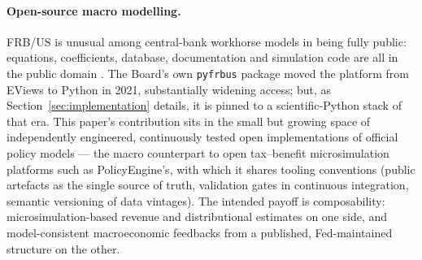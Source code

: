 \paragraph{Open-source macro modelling.} FRB/US is unusual among central-bank workhorse models in being fully public: equations, coefficients, database, documentation and simulation code are all in the public domain \citep{fedfrbusabout}. The Board's own \texttt{pyfrbus} package \citep{fedfrbuspython} moved the platform from EViews to Python in 2021, substantially widening access; but, as Section~\ref{sec:implementation} details, it is pinned to a scientific-Python stack of that era. This paper's contribution sits in the small but growing space of independently engineered, continuously tested open implementations of official policy models --- the macro counterpart to open tax--benefit microsimulation platforms such as PolicyEngine's, with which it shares tooling conventions (public artefacts as the single source of truth, validation gates in continuous integration, semantic versioning of data vintages). The intended payoff is composability: microsimulation-based revenue and distributional estimates on one side, and model-consistent macroeconomic feedbacks from a published, Fed-maintained structure on the other.
